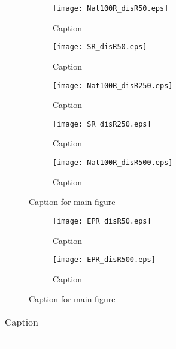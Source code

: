 \begin{figure}[H]
    \centering
    \begin{subfigure}[b]{0.49\textwidth}
        \centering
        \texttt{[image: Nat100R\_disR50.eps]}
        \caption{Caption}
        \label{fig:Nat100R50}
    \end{subfigure}
    \hfill
    \begin{subfigure}[b]{0.49\textwidth}
        \centering
        \texttt{[image: SR\_disR50.eps]}
        \caption{Caption}
        \label{fig:SR50}
    \end{subfigure}
    \hfill
    \begin{subfigure}[b]{0.49\textwidth}
        \centering
        \texttt{[image: Nat100R\_disR250.eps]}
        \caption{Caption}
        \label{fig:Nat100R250}
    \end{subfigure}
    \hfill
    \begin{subfigure}[b]{0.49\textwidth}
        \centering
        \texttt{[image: SR\_disR250.eps]}
        \caption{Caption}
        \label{fig:SR250}
    \end{subfigure}
    \hfill
    \begin{subfigure}[b]{0.49\textwidth}
        \centering
        \texttt{[image: Nat100R\_disR500.eps]}
        \caption{Caption}
        \label{fig:Nat100R500}
    \end{subfigure}
    \hspace*{\fill}
    \caption{Caption for main figure}
    \label{fig:Nat100R}
\end{figure}

\begin{figure}[H]
    \centering
    \begin{subfigure}[b]{0.49\textwidth}
        \centering
        \texttt{[image: EPR\_disR50.eps]}
        \caption{Caption}
        \label{fig:EPR50}
    \end{subfigure}
    \hfill
    \begin{subfigure}[b]{0.49\textwidth}
        \centering
        \texttt{[image: EPR\_disR500.eps]}
        \caption{Caption}
        \label{fig:EPR500}
    \end{subfigure}
    \caption{Caption for main figure}
    \label{fig:EPR}
\end{figure}

\begin{table}[ht!]
    \centering
    \begin{tabular}{c|c}
         &  \\
         & 
    \end{tabular}
    \caption{Caption}
    \label{tab:my_label}
\end{table}

